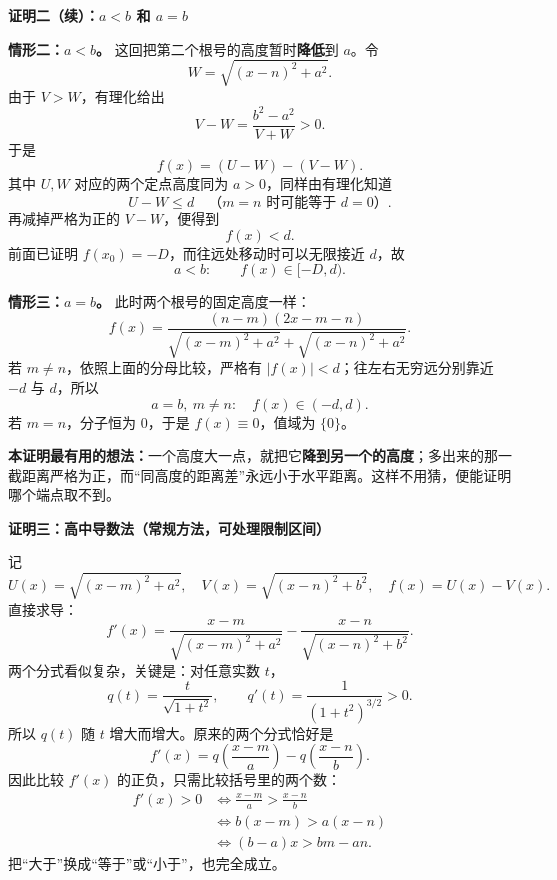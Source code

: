 \clearpage
\begin{proofbox}
\textbf{\textcolor{CProof}{证明二（续）：$a<b$ 和 $a=b$}}



\textbf{情形二：$a<b$。} 这回把第二个根号的高度暂时\textbf{降低}到 $a$。令
\[
 W=\sqrt{(x-n)^2+a^2}.
\]
由于 $V>W$，有理化给出
\[
 V-W=\frac{b^2-a^2}{V+W}>0.
\]
于是
\[
 f(x)=(U-W)-(V-W).
\]
其中 $U,W$ 对应的两个定点高度同为 $a>0$，同样由有理化知道
\[
 U-W\leq d \quad\text{（$m=n$ 时可能等于 $d=0$）}.
\]
再减掉严格为正的 $V-W$，便得到
\[
 \boxed{f(x)<d}.
\]
前面已证明 $f(x_0)=-D$，而往远处移动时可以无限接近 $d$，故
\[
 \boxed{a<b:\qquad f(x)\in[-D,d)}.
\]

\end{proofbox}
\clearpage
\begin{proofbox}

\textbf{情形三：$a=b$。} 此时两个根号的固定高度一样：
\[
 f(x)=\frac{(n-m)(2x-m-n)}{
 \sqrt{(x-m)^2+a^2}+\sqrt{(x-n)^2+a^2}}.
\]
若 $m\ne n$，依照上面的分母比较，严格有 $|f(x)|<d$；往左右无穷远分别靠近 $-d$ 与 $d$，所以
\[
 \boxed{a=b,\ m\ne n:\quad f(x)\in(-d,d)}.
\]
若 $m=n$，分子恒为 $0$，于是 $f(x)\equiv0$，值域为 $\{0\}$。

\textbf{本证明最有用的想法：}一个高度大一点，就把它\textbf{降到另一个的高度}；多出来的那一截距离严格为正，而“同高度的距离差”永远小于水平距离。这样不用猜，便能证明哪个端点取不到。
\end{proofbox}
\clearpage
\begin{proofbox}
\textbf{\textcolor{CProof}{证明三：高中导数法（常规方法，可处理限制区间）}}



记
\[
 U(x)=\sqrt{(x-m)^2+a^2},\quad
 V(x)=\sqrt{(x-n)^2+b^2},\quad f(x)=U(x)-V(x).
\]
直接求导：
\[
 f'(x)=\frac{x-m}{\sqrt{(x-m)^2+a^2}}
       -\frac{x-n}{\sqrt{(x-n)^2+b^2}}.
\]
两个分式看似复杂，关键是：对任意实数 $t$，
\[
 q(t)=\frac{t}{\sqrt{1+t^2}},\qquad
 q'(t)=\frac{1}{(1+t^2)^{3/2}}>0.
\]
所以 $q(t)$ 随 $t$ 增大而增大。原来的两个分式恰好是
\[
 f'(x)=q\!\left(\frac{x-m}{a}\right)
       -q\!\left(\frac{x-n}{b}\right).
\]
因此比较 $f'(x)$ 的正负，只需比较括号里的两个数：
\[
 \begin{aligned}
 f'(x)>0
 &\Longleftrightarrow \frac{x-m}{a}>\frac{x-n}{b}\\
 &\Longleftrightarrow b(x-m)>a(x-n)\\
 &\Longleftrightarrow (b-a)x>bm-an.
 \end{aligned}
\]
把“大于”换成“等于”或“小于”，也完全成立。

\end{proofbox}
